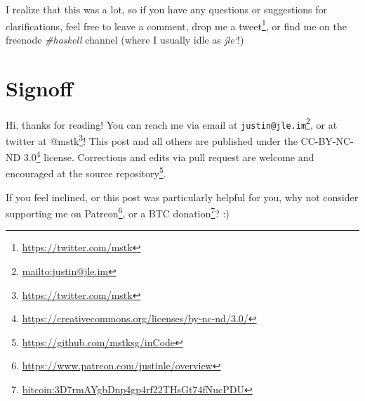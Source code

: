 \documentclass[]{article}
\renewcommand{\href}[2]{#2\footnote{\url{#1}}}
\begin{document}
I realize that this was a lot, so if you have any questions or suggestions for
clarifications, feel free to leave a comment, drop me a
\href{https://twitter.com/mstk}{tweet}, or find me on the freenode
\emph{\#haskell} channel (where I usually idle as \emph{jle`}!)

\section{Signoff}\label{signoff}

Hi, thanks for reading! You can reach me via email at
\href{mailto:justin@jle.im}{\nolinkurl{justin@jle.im}}, or at twitter at
\href{https://twitter.com/mstk}{@mstk}! This post and all others are published
under the \href{https://creativecommons.org/licenses/by-nc-nd/3.0/}{CC-BY-NC-ND
3.0} license. Corrections and edits via pull request are welcome and encouraged
at \href{https://github.com/mstksg/inCode}{the source repository}.

If you feel inclined, or this post was particularly helpful for you, why not
consider \href{https://www.patreon.com/justinle/overview}{supporting me on
Patreon}, or a \href{bitcoin:3D7rmAYgbDnp4gp4rf22THsGt74fNucPDU}{BTC donation}?
:)
\end{document}
